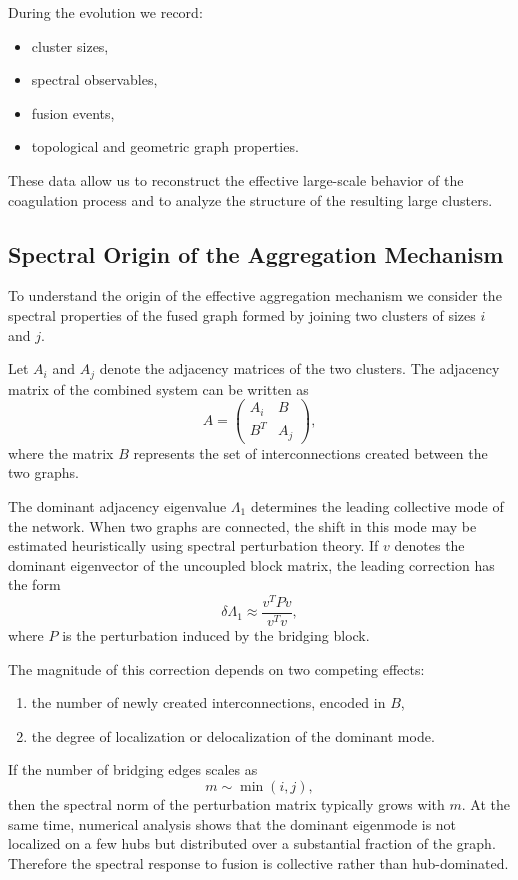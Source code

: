 \documentclass[11pt]{article}
\begin{document}
During the evolution we record:
\begin{itemize}
\item cluster sizes,
\item spectral observables,
\item fusion events,
\item topological and geometric graph properties.
\end{itemize}

These data allow us to reconstruct the effective large-scale behavior of the coagulation process and to analyze the structure of the resulting large clusters.

\subsection{Spectral Origin of the Aggregation Mechanism}

To understand the origin of the effective aggregation mechanism we consider the spectral properties of the fused graph formed by joining two clusters of sizes $i$ and $j$.

Let $A_i$ and $A_j$ denote the adjacency matrices of the two clusters.
The adjacency matrix of the combined system can be written as
\[
A =
\begin{pmatrix}
A_i & B \\
B^{T} & A_j
\end{pmatrix},
\]
where the matrix $B$ represents the set of interconnections created between the two graphs.

The dominant adjacency eigenvalue $\Lambda_1$ determines the leading collective mode of the network.
When two graphs are connected, the shift in this mode may be estimated heuristically using spectral perturbation theory.
If $v$ denotes the dominant eigenvector of the uncoupled block matrix, the leading correction has the form
\[
\delta \Lambda_1 \approx \frac{v^{T} P v}{v^{T}v},
\]
where $P$ is the perturbation induced by the bridging block.

The magnitude of this correction depends on two competing effects:

\begin{enumerate}
\item the number of newly created interconnections, encoded in $B$,
\item the degree of localization or delocalization of the dominant mode.
\end{enumerate}

If the number of bridging edges scales as
\[
m \sim \min(i,j),
\]
then the spectral norm of the perturbation matrix typically grows with $m$.
At the same time, numerical analysis shows that the dominant eigenmode is not localized on a few hubs but distributed over a substantial fraction of the graph.
Therefore the spectral response to fusion is collective rather than hub-dominated.
\end{document}
